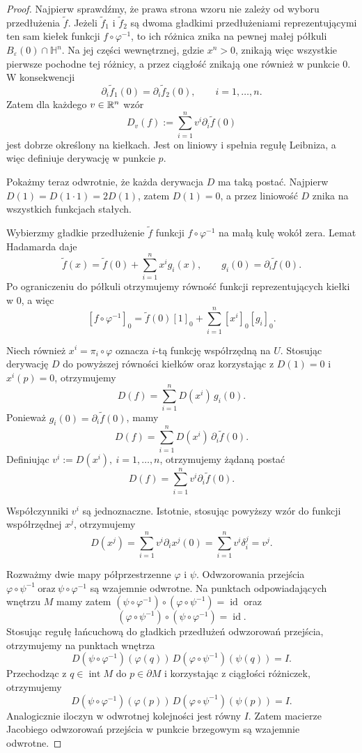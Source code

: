 \begin{proof}
Najpierw sprawdźmy, że prawa strona wzoru nie zależy od wyboru
przedłużenia $\widetilde f$. Jeżeli $\widetilde f_1$ i
$\widetilde f_2$ są dwoma gładkimi przedłużeniami reprezentującymi
ten sam kiełek funkcji $f\circ\varphi^{-1}$, to ich różnica znika
na pewnej małej półkuli $B_\varepsilon(0)\cap\mathbb H^n$.
Na jej części wewnętrznej, gdzie $x^n>0$, znikają więc wszystkie
pierwsze pochodne tej różnicy, a przez ciągłość znikają one również
w punkcie $0$. W konsekwencji
\[
\partial_i\widetilde f_1(0)
=
\partial_i\widetilde f_2(0),
\qquad i=1,\ldots,n.
\]
Zatem dla każdego $v\in\mathbb{R}^n$ wzór
\[
D_v(f):=\sum_{i=1}^n v^i\partial_i\widetilde f(0)
\]
jest dobrze określony na kiełkach. Jest on liniowy i spełnia regułę
Leibniza, a więc definiuje derywację w punkcie $p$.

Pokażmy teraz odwrotnie, że każda derywacja $D$ ma taką postać.
Najpierw $D(1)=D(1\cdot1)=2D(1)$,
zatem $D(1)=0$, a przez liniowość $D$ znika na wszystkich funkcjach
stałych.

Wybierzmy gładkie przedłużenie $\widetilde f$ funkcji
$f\circ\varphi^{-1}$ na małą kulę wokół zera. Lemat Hadamarda daje
\[
\widetilde f(x)
=
\widetilde f(0)+\sum_{i=1}^n x^i g_i(x),
\qquad
g_i(0)=\partial_i\widetilde f(0).
\]
Po ograniczeniu do półkuli otrzymujemy równość funkcji
reprezentujących kiełki w $0$, a więc
\[
[f\circ\varphi^{-1}]_0
=
\widetilde f(0)[1]_0
+
\sum_{i=1}^n [x^i]_0[g_i]_0.
\]

Niech również $x^i=\pi_i\circ\varphi$ oznacza $i$-tą funkcję
współrzędną na $U$. Stosując derywację $D$ do powyższej równości
kiełków oraz korzystając z $D(1)=0$ i $x^i(p)=0$, otrzymujemy
\[
D(f)
=
\sum_{i=1}^n D(x^i)\,g_i(0).
\]
Ponieważ $g_i(0)=\partial_i\widetilde f(0)$,
mamy
\[
D(f)
=
\sum_{i=1}^n D(x^i)\,\partial_i\widetilde f(0).
\]
Definiując $v^i:=D(x^i), \ i=1,\ldots,n$,
otrzymujemy żądaną postać
\[
D(f)
=
\sum_{i=1}^n v^i\partial_i\widetilde f(0).
\]

Współczynniki $v^i$ są jednoznaczne. Istotnie, stosując powyższy
wzór do funkcji współrzędnej $x^j$, otrzymujemy
\[
D(x^j)
=
\sum_{i=1}^n v^i\partial_i x^j(0)
=
\sum_{i=1}^n v^i\delta_i^j
=
v^j.
\]

Rozważmy dwie mapy półprzestrzenne $\varphi$ i $\psi$.
Odwzorowania przejścia $\varphi\circ\psi^{-1} \ \text{oraz}\ \psi\circ\varphi^{-1}$
są wzajemnie odwrotne. Na punktach odpowiadających wnętrzu $M$ mamy zatem
$(\psi\circ\varphi^{-1})\circ(\varphi\circ\psi^{-1}) =\operatorname{id}$
oraz
\[
(\varphi\circ\psi^{-1})\circ(\psi\circ\varphi^{-1})
=\operatorname{id}.
\]
Stosując regułę łańcuchową do gładkich przedłużeń odwzorowań
przejścia, otrzymujemy na punktach wnętrza
\[
D(\psi\circ\varphi^{-1})(\varphi(q))\,
D(\varphi\circ\psi^{-1})(\psi(q))
=I.
\]
Przechodząc z $q\in\operatorname{int}M$ do $p\in\partial M$
i korzystając z ciągłości różniczek, otrzymujemy
\[
D(\psi\circ\varphi^{-1})(\varphi(p))\,
D(\varphi\circ\psi^{-1})(\psi(p))
=I.
\]
Analogicznie iloczyn w odwrotnej kolejności jest równy $I$.
Zatem macierze Jacobiego odwzorowań przejścia w punkcie brzegowym
są wzajemnie odwrotne.


\end{proof}
